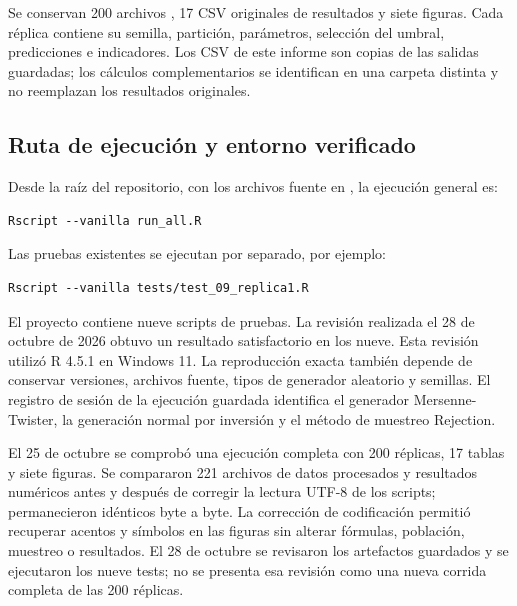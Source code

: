 \documentclass[11pt,a4paper]{article}
\newcommand{\archivo}[1]{\path{#1}}
\begin{document}
Se conservan 200 archivos \archivo{replica_XXX.rds}, 17 CSV originales de resultados y siete figuras. Cada réplica contiene su semilla, partición, parámetros, selección del umbral, predicciones e indicadores. Los CSV de este informe son copias de las salidas guardadas; los cálculos complementarios se identifican en una carpeta distinta y no reemplazan los resultados originales.

\subsection{Ruta de ejecución y entorno verificado}
Desde la raíz del repositorio, con los archivos fuente en \archivo{data/raw/}, la ejecución general es:
\begin{lstlisting}
Rscript --vanilla run_all.R
\end{lstlisting}
Las pruebas existentes se ejecutan por separado, por ejemplo:
\begin{lstlisting}
Rscript --vanilla tests/test_09_replica1.R
\end{lstlisting}
El proyecto contiene nueve scripts de pruebas. La revisión realizada el 28 de octubre de 2026 obtuvo un resultado satisfactorio en los nueve. Esta revisión utilizó R 4.5.1 en Windows 11. La reproducción exacta también depende de conservar versiones, archivos fuente, tipos de generador aleatorio y semillas. El registro de sesión de la ejecución guardada identifica el generador Mersenne-Twister, la generación normal por inversión y el método de muestreo Rejection.

El 25 de octubre se comprobó una ejecución completa con 200 réplicas, 17 tablas y siete figuras. Se compararon 221 archivos de datos procesados y resultados numéricos antes y después de corregir la lectura UTF-8 de los scripts; permanecieron idénticos byte a byte. La corrección de codificación permitió recuperar acentos y símbolos en las figuras sin alterar fórmulas, población, muestreo o resultados. El 28 de octubre se revisaron los artefactos guardados y se ejecutaron los nueve tests; no se presenta esa revisión como una nueva corrida completa de las 200 réplicas.
\end{document}
